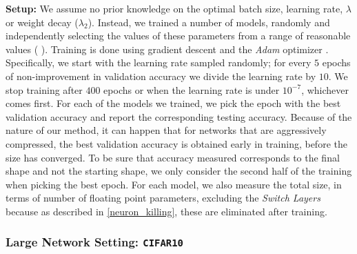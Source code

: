 \noindent\textbf{Setup: }
We assume no prior knowledge on the optimal batch size, learning rate, $\lambda$
or weight decay ($\lambda_2$). Instead, we trained a number of models, randomly
and independently selecting the values of these parameters from a range of
reasonable values ( ).  
Training is done using gradient descent and the \textit{Adam}
optimizer \cite{DBLP:journals/corr/KingmaB14}. Specifically, we start with the
learning rate sampled randomly; for every $5$ epochs of non-improvement in
validation accuracy we divide the learning rate by $10$. We stop training after
$400$ epochs or when the learning rate is under $10^{-7}$, whichever comes
first.  
 For each of the models we trained, we pick the
epoch with the best validation accuracy and report the corresponding testing
accuracy. Because of the nature of our method, it can happen that for networks
that are aggressively compressed, the best validation accuracy is obtained early
in  training, before the size has converged. To be sure that accuracy measured
corresponds to the final shape and not the starting shape, we only consider the
second half of the training when picking the best epoch. For each model, we also
measure the total size, in terms of number of floating point parameters,
excluding the \textit{Switch Layers} because as described in
\cref{neuron_killing}, these are eliminated after training.




\subsubsection{Large Network Setting: \texttt{CIFAR10}}


